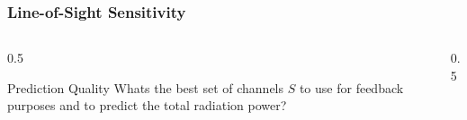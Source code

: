 \begin{frame}
    \frametitle{Line-of-Sight Sensitivity}
    \backgroundlogo%

    \begin{columns}
        \begin{column}{0.5\textwidth}
            \begin{exampleblock}{Prediction Quality}
                Whats the best set of channels $S$ to use for feedback purposes and to predict the total radiation power?
            \end{exampleblock}
        \end{column}

        \begin{column}{0.5\textwidth}
            \begin{itemize}
            \end{itemize}
        \end{column}
    \end{columns}

\end{frame}

